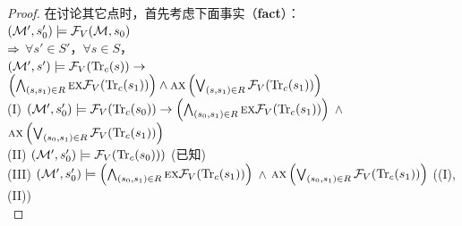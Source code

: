 \begin{proof}
	在讨论其它点时，首先考虑下面事实（\textbf{fact}）：\\
	$({\cal M}',s_0') \models {\cal F}_V({\cal M},s_0)$\\
	$\Rightarrow$ $\forall s'\in S'$，$\forall s\in S$，\\ $({\cal M}', s')\models {\cal F}_V(\textrm{Tr}_c(s)) \rightarrow$  $\left(\bigwedge_{(s,s_1)\in R} \textsc{e} \textsc{x} {\cal F}_V(\textrm{Tr}_c(s_1))\right)\wedge \textsc{a} \textsc{x} \left( \bigvee_{(s,s_1)\in R} {\cal F}_V(\textrm{Tr}_c(s_1))\right)$  \\
	(I) $({\cal M}', s_0') \models {\cal F}_V(\textrm{Tr}_c(s_0)) \rightarrow \left(\bigwedge_{(s_0, s_1) \in R} \textsc{e} \textsc{x} {\cal F}_V(\textrm{Tr}_c(s_1))\right)$ $\wedge$ $\textsc{a} \textsc{x} \left(\bigvee_{(s_0, s_1) \in R} {\cal F}_V(\textrm{Tr}_c(s_1)) \right)$     \\
	(II) $({\cal M}', s_0') \models {\cal F}_V(\textrm{Tr}_c(s_0)))$  \hfill  (已知)\\
	(III) $({\cal M}', s_0') \models \left(\bigwedge_{(s_0, s_1) \in R} \textsc{e} \textsc{x} {\cal F}_V(\textrm{Tr}_c(s_1))\right)$ $\wedge$ $\textsc{a} \textsc{x} \left(\bigvee_{(s_0, s_1) \in R} {\cal F}_V(\textrm{Tr}_c(s_1)) \right)$  \hfill  ((I),(II))\\
	

\end{proof}
